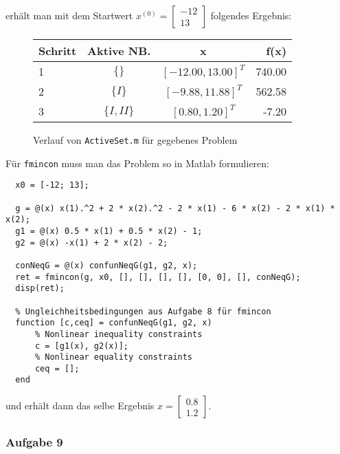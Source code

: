 \documentclass[a4paper, 12pt]{report}
\begin{document}
erhält man mit dem Startwert $x^{(0)} = \begin{bmatrix}-12\\13\end{bmatrix}$ folgendes Ergebnis:

\begin{figure}[H]
  \centering
  \def\arraystretch{1.25}
  \begin{tabular}{l|c|c|r}
    \hline
    \textbf{Schritt} & \textbf{Aktive NB.} & \textbf{x} & \textbf{f(x)}\\
    \hline
    1 & $\{\}$ & $[-12.00, 13.00]^T$ & 740.00\\
    2 & $\{I\}$ & $[-9.88, 11.88]^T$ & 562.58\\
    3 & $\{I, II\}$ & $[0.80, 1.20]^T$ & -7.20\\
    \hline
  \end{tabular}
  \caption{Verlauf von \lstinline[basicstyle=\ttfamily\color{black}]|ActiveSet.m| für gegebenes Problem}
\end{figure}

Für \lstinline[basicstyle=\ttfamily]|fmincon| muss man das Problem so in Matlab formulieren:

\begin{lstlisting}
  x0 = [-12; 13];

  g = @(x) x(1).^2 + 2 * x(2).^2 - 2 * x(1) - 6 * x(2) - 2 * x(1) * x(2);
  g1 = @(x) 0.5 * x(1) + 0.5 * x(2) - 1;
  g2 = @(x) -x(1) + 2 * x(2) - 2;

  conNeqG = @(x) confunNeqG(g1, g2, x);
  ret = fmincon(g, x0, [], [], [], [], [0, 0], [], conNeqG);
  disp(ret);
  
  % Ungleichheitsbedingungen aus Aufgabe 8 für fmincon
  function [c,ceq] = confunNeqG(g1, g2, x)
      % Nonlinear inequality constraints
      c = [g1(x), g2(x)];
      % Nonlinear equality constraints
      ceq = [];
  end\end{lstlisting}

und erhält dann das selbe Ergebnis $x = \begin{bmatrix}0.8\\1.2\end{bmatrix}$.

\subsubsection{Aufgabe 9}
\end{document}
